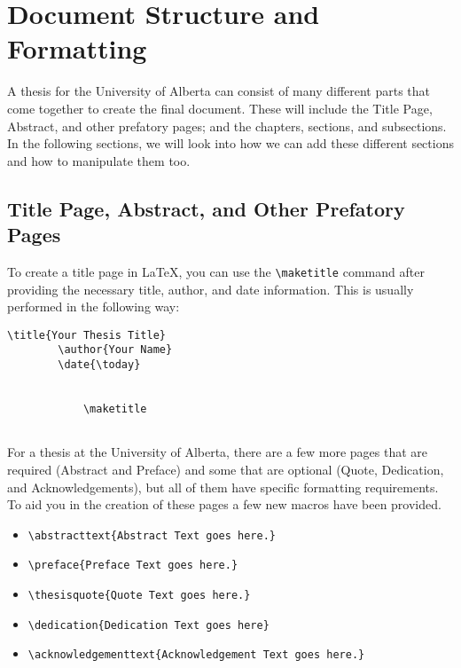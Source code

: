 \chapter{Document Structure and Formatting}
	A thesis for the University of Alberta can consist of many different parts that come together to create the final document.
	These will include the Title Page, Abstract, and other prefatory pages; and the chapters, sections, and subsections.
	In the following sections, we will look into how we can add these different sections and how to manipulate them too.
	
	\section{Title Page, Abstract, and Other Prefatory Pages}
		To create a title page in \LaTeX{}, you can use the \lstinline|\maketitle| command after providing the necessary title, author, and date information. 
		This is usually performed in the following way:

		\begin{lstlisting}[style=LaTeXStyle]
		\title{Your Thesis Title}
		\author{Your Name}
		\date{\today}

		
			\maketitle
		
		\end{lstlisting}

		For a thesis at the University of Alberta, there are a few more pages that are required (Abstract and Preface) and some that are optional (Quote, Dedication, and Acknowledgements), but all of them have specific formatting requirements.
		To aid you in the creation of these pages a few new macros have been provided.
		\begin{itemize}
			\item \lstinline|\abstracttext{Abstract Text goes here.}|
			\item \lstinline|\preface{Preface Text goes here.}|
			\item \lstinline|\thesisquote{Quote Text goes here.}|
			\item \lstinline|\dedication{Dedication Text goes here}|
			\item \lstinline|\acknowledgementtext{Acknowledgement Text goes here.}|
		\end{itemize}


